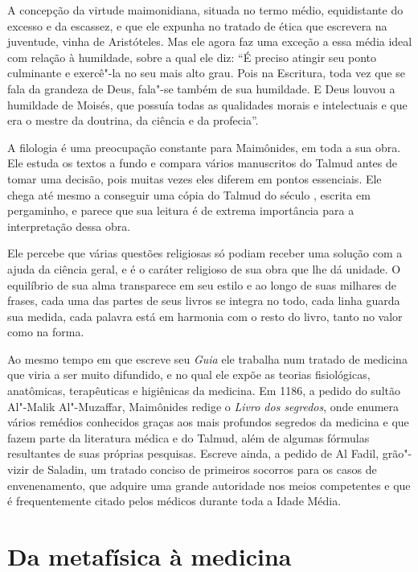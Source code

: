 A concepção da virtude maimonidiana, situada no termo médio,
equidistante do excesso e da escassez, e que ele expunha no tratado de
ética que escrevera na juventude, vinha de Aristóteles. Mas ele agora
faz uma exceção a essa média ideal com relação à humildade, sobre a qual
ele diz: ``É preciso atingir seu ponto culminante e exercê"-la no seu
mais alto grau. Pois na Escritura, toda vez que se fala da grandeza de
Deus, fala"-se também de sua humildade. E Deus louvou a humildade de
Moisés, que possuía todas as qualidades morais e intelectuais e que era
o mestre da doutrina, da ciência e da profecia''.

A filologia é uma preocupação constante para Maimônides, em toda a sua
obra. Ele estuda os textos a fundo e compara vários manuscritos do
Talmud antes de tomar uma decisão, pois muitas vezes eles diferem
em pontos essenciais. Ele chega até mesmo a conseguir uma cópia do
Talmud do século , escrita em pergaminho, e parece que sua
leitura é de extrema importância para a interpretação dessa obra.

Ele percebe que várias questões religiosas só podiam receber uma solução
com a ajuda da ciência geral, e é o caráter religioso de sua obra que
lhe dá unidade. O equilíbrio de sua alma transparece em seu estilo e ao
longo de suas milhares de frases, cada uma das partes de seus livros se
integra no todo, cada linha guarda sua medida, cada palavra está em
harmonia com o resto do livro, tanto no valor como na forma.

Ao mesmo tempo em que escreve seu \emph{Guia} ele trabalha num tratado
de medicina que viria a ser muito difundido, e no qual ele expõe as
teorias fisiológicas, anatômicas, terapêuticas e higiênicas da medicina.
Em 1186, a pedido do sultão Al"-Malik Al"-Muzaffar, Maimônides redige o
\emph{Livro dos segredos}, onde enumera vários remédios conhecidos
graças aos mais profundos segredos da medicina e que fazem parte da
literatura médica e do Talmud, além de algumas fórmulas
resultantes de suas próprias pesquisas. Escreve ainda, a pedido de Al
Fadil, grão"-vizir de Saladin, um tratado conciso de primeiros socorros
para os casos de envenenamento, que adquire uma grande autoridade nos
meios competentes e que é frequentemente citado pelos médicos durante
toda a Idade Média.

\section{Da metafísica à medicina}

